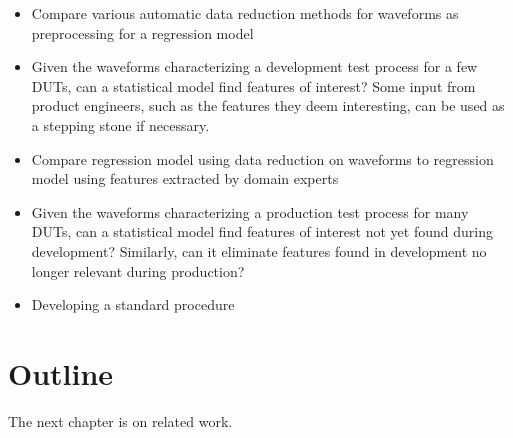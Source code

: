 \begin{itemize}
      \item Compare various automatic data reduction methods for waveforms as
            preprocessing for a regression model
      \item Given the waveforms characterizing a development test process for a few DUTs, can a statistical
            model find features of interest? Some input from product engineers, such as the features they deem
            interesting, can be used as a stepping stone if necessary.
      \item Compare regression model using data reduction on waveforms to
            regression model using features extracted by domain experts
      \item Given the waveforms characterizing a production test process for many DUTs, can a statistical model
            find features of interest not yet found during development? Similarly, can it eliminate features found
            in development no longer relevant during production?
      \item Developing a standard procedure
\end{itemize}

\section{Outline}

The next chapter is on related work.

